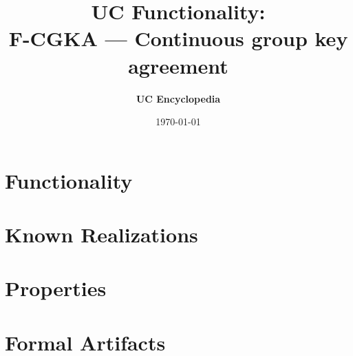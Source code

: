 \documentclass[11pt,a4paper]{article}
\title{\textbf{\Large UC Functionality:}\\[0.2em] \Large F-CGKA --- Continuous group key agreement}
\author{\textbf{UC Encyclopedia}}
\date{\today}
\newtheorem{functionality}{Functionality}
\begin{document}
\maketitle

\begin{abstract}
\end{abstract}

\section{Functionality}

%

\section{Known Realizations}


\section{Properties}


\section{Formal Artifacts}

\end{document}
